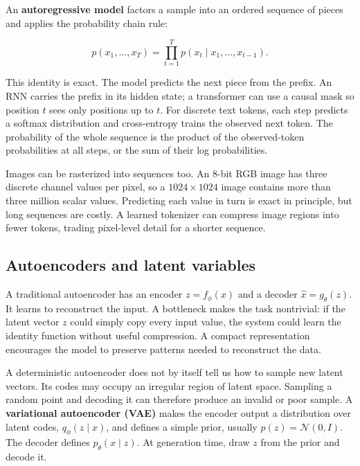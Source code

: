 An \textbf{autoregressive model} factors a sample into an ordered sequence of pieces and applies the probability chain rule:

\[
p(x_1,\ldots,x_T)=\prod_{t=1}^{T}p(x_t\mid x_1,\ldots,x_{t-1}).
\]

This identity is exact. The model predicts the next piece from the prefix. An RNN carries the prefix in its hidden state; a transformer can use a causal mask so position \(t\) sees only positions up to \(t\). For discrete text tokens, each step predicts a softmax distribution and cross-entropy trains the observed next token. The probability of the whole sequence is the product of the observed-token probabilities at all steps, or the sum of their log probabilities.

Images can be rasterized into sequences too. An 8-bit RGB image has three discrete channel values per pixel, so a \(1024\times1024\) image contains more than three million scalar values. Predicting each value in turn is exact in principle, but long sequences are costly. A learned tokenizer can compress image regions into fewer tokens, trading pixel-level detail for a shorter sequence.

\subsection{Autoencoders and latent variables}\label{04-visual-computing-ii-ch031-autoencoders-and-latent-variables}

\hypertarget{04-visual-computing-ii-ch031-autoencoders-and-latent-variables}{}

A traditional autoencoder has an encoder \(z=f_\phi(x)\) and a decoder \(\hat{x}=g_\theta(z)\). It learns to reconstruct the input. A bottleneck makes the task nontrivial: if the latent vector \(z\) could simply copy every input value, the system could learn the identity function without useful compression. A compact representation encourages the model to preserve patterns needed to reconstruct the data.

A deterministic autoencoder does not by itself tell us how to sample new latent vectors. Its codes may occupy an irregular region of latent space. Sampling a random point and decoding it can therefore produce an invalid or poor sample. A \textbf{variational autoencoder (VAE)} makes the encoder output a distribution over latent codes, \(q_\phi(z\mid x)\), and defines a simple prior, usually \(p(z)=\mathcal{N}(0,I)\). The decoder defines \(p_\theta(x\mid z)\). At generation time, draw \(z\) from the prior and decode it.

